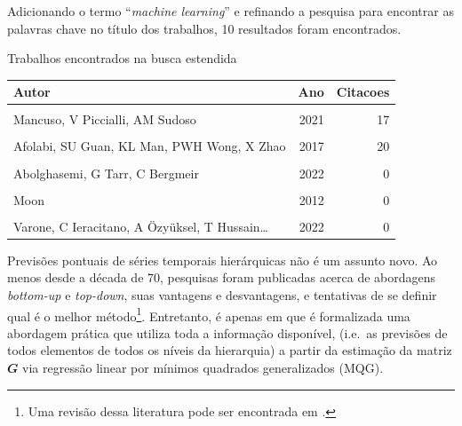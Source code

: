 \documentclass[
  12pt,
  oneside,
  a4paper,
  chapter=TITLE,
  section=TITLE,
  brazil]{abntex2}
\begin{document}
Adicionando o termo ``\emph{machine learning}'' e refinando a pesquisa
para encontrar as palavras chave no título dos trabalhos, 10 resultados
foram encontrados.

\begin{quadro}
\caption{Trabalhos encontrados na busca estendida}\tabularnewline

\centering\begingroup\fontsize{10}{12}\selectfont

\begin{tabular}[t]{lrr}
\toprule
Autor & Ano & Citacoes\\
\midrule
\cellcolor{gray!6}{Li, SMM Rahman, R Vega, B Dong} & \cellcolor{gray!6}{2016} & \cellcolor{gray!6}{114}\\
Mancuso, V Piccialli, AM Sudoso & 2021 & 17\\
\cellcolor{gray!6}{Abolghasemi, RJ Hyndman, G Tarr} & \cellcolor{gray!6}{2019} & \cellcolor{gray!6}{13}\\
Afolabi, SU Guan, KL Man, PWH Wong, X Zhao & 2017 & 20\\
\cellcolor{gray!6}{Saatloo, A Moradzadeh, H Moayyed} & \cellcolor{gray!6}{2021} & \cellcolor{gray!6}{6}\\
\addlinespace
Abolghasemi, G Tarr, C Bergmeir & 2022 & 0\\
\cellcolor{gray!6}{C Neto, BL Fernando…} & \cellcolor{gray!6}{2022} & \cellcolor{gray!6}{0}\\
Moon & 2012 & 0\\
\cellcolor{gray!6}{YAN, C SHENG} & \cellcolor{gray!6}{2018} & \cellcolor{gray!6}{1}\\
Varone, C Ieracitano, A Özyüksel, T Hussain… & 2022 & 0\\
\bottomrule
\end{tabular}
\endgroup{}
\end{quadro}

Previsões pontuais de séries temporais hierárquicas não é um assunto
novo. Ao menos desde a década de 70, pesquisas foram publicadas acerca
de abordagens \emph{bottom-up} e \emph{top-down}, suas vantagens e
desvantagens, e tentativas de se definir qual é o melhor
método\footnote{Uma revisão dessa literatura pode ser encontrada em
  \textcite{athanasopoulos2009}.}. Entretanto, é apenas em
\textcite{hyndman2011} que é formalizada uma abordagem prática que
utiliza toda a informação disponível, (i.e.~as previsões de todos
elementos de todos os níveis da hierarquia) a partir da estimação da
matriz \(\mathbfit{G}\) via regressão linear por mínimos quadrados
generalizados (MQG).
\end{document}
